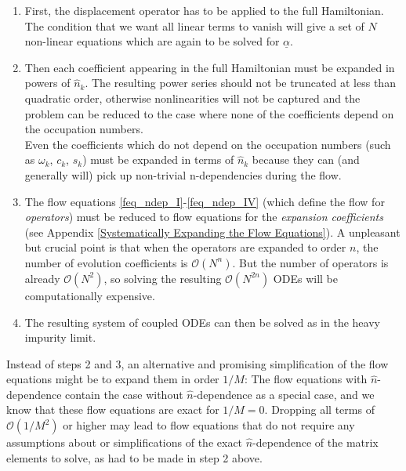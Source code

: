 \begin{enumerate}
\item First, the displacement operator has to be applied to the full Hamiltonian. The condition that we want all linear terms to vanish will give a set of $N$ non-linear equations which are again to be solved for $\underline\alpha$. 
\item Then each coefficient appearing in the full Hamiltonian must be expanded in powers of $\hat n_k$. The resulting power series should not be truncated at less than quadratic order, otherwise nonlinearities will not be captured and the problem can be reduced to the case where none of the coefficients depend on the occupation numbers. \\ Even the coefficients which do not depend on the occupation numbers (such as $\omega_k$, $c_k$, $s_k$) must be expanded in terms of $\hat n_k$ because they can (and generally will) pick up non-trivial n-dependencies during the flow.
\item The flow equations \ref{feq_ndep_I}-\ref{feq_ndep_IV} (which define the flow for \emph{operators}) must be reduced to flow equations for the \emph{expansion coefficients} (see Appendix \ref{Systematically Expanding the Flow Equations}). A unpleasant but crucial point is that when the operators are expanded to order $n$, the number of evolution coefficients is $\mathcal O(N^n)$. But the number of operators is already $\mathcal O(N^2)$, so solving the resulting $\mathcal O(N^{2n})$ ODEs will be computationally expensive.
\item The resulting system of coupled ODEs can then be solved as in the heavy impurity limit.
\end{enumerate}
Instead of steps 2 and 3, an alternative and promising simplification of the flow equations might be to expand them in order $1/M$: The flow equations with $\hat n$-dependence contain the case without $\hat n$-dependence as a special case, and we know that these flow equations are exact for $1/M=0$. Dropping all terms of $\mathcal O(1/M^2)$ or higher may lead to flow equations that do not require any assumptions about or simplifications of the exact $\hat n$-dependence of the matrix elements to solve, as had to be made in step 2 above.





























































